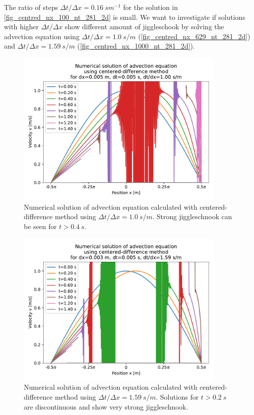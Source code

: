 The ratio of steps $\Delta t / \Delta x = 0.16 \ s m^{-1}$ for the solution in \autoref{fig_centred_nx_100_nt_281_2d} is small. We want to investigate if solutions with higher $\Delta t / \Delta x$ show different amount of jiggleschook by solving the advection equation using $\Delta t / \Delta x = 1.0 \ s/m$ (\autoref{fig_centred_nx_629_nt_281_2d}) and $\Delta t / \Delta x = 1.59 \ s/m$ (\autoref{fig_centred_nx_1000_nt_281_2d}).
\vspace*{-5mm}
\begin{figure}[H]
  \centering
  \includegraphics[width=0.9\textwidth]{figures/numerical/centred_nx_629_nt_281_2d.pdf}
  \vspace*{-5mm}
  \caption{Numerical solution of advection equation calculated with centered-difference method using $\Delta t / \Delta x = 1.0 \ s/m$. Strong jiggleschnook can be seen for $t > 0.4 \ s$.}
  \label{fig_centred_nx_629_nt_281_2d}
  \vspace*{-10mm}
\end{figure}
\begin{figure}[H]
  \centering
  \includegraphics[width=0.9\textwidth]{figures/numerical/centred_nx_1000_nt_281_2d.pdf}
  \vspace*{-5mm}
  \caption{Numerical solution of advection equation calculated with centered-difference method using $\Delta t / \Delta x = 1.59 \ s/m$. Solutions for $t > 0.2 \ s$ are discontinuous and show very strong jiggleschnook.}
  \label{fig_centred_nx_1000_nt_281_2d}
  \vspace*{-10mm}
\end{figure}

